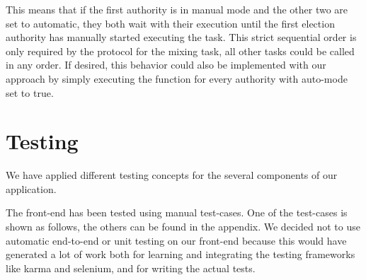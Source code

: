 This means that if the first authority is in manual mode and the other two are set to automatic, they both wait with their execution until the first election authority has manually started executing the task. This strict sequential order is only required by the protocol for the mixing task, all other tasks could be called in any order. If desired, this behavior could also be implemented with our approach by simply executing the function for every authority with auto-mode set to true.

\section{Testing}
We have applied different testing concepts for the several components of our application.

The front-end has been tested using manual test-cases. One of the test-cases is shown as follows, the others can be found in the appendix. We decided not to use automatic end-to-end or unit testing on our front-end because this would have generated a lot of work both for learning and integrating the testing frameworks like karma and selenium, and for writing the actual tests.

